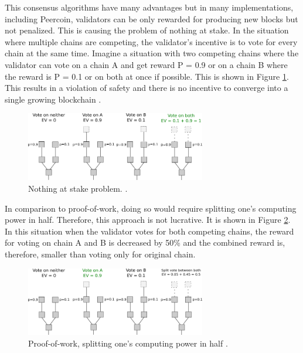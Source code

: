 This consensus algorithms have many advantages but in many implementations, including Peercoin, validators can be only rewarded for producing new blocks but not penalized. This is causing the problem of nothing at stake. In the situation where multiple chains are competing, the validator's incentive is to vote for every chain at the same time. Imagine a situation with two competing chains where the validator can vote on a chain A and get reward P = 0.9 or on a chain B where the reward is P = 0.1 or on both at once if possible. This is shown in Figure \ref{fig:nothing-at-stake}. This results in a violation of safety and there is no incentive to converge into a single growing blockchain \cite{noauthor_proof_nodate}.

\begin{figure}[ht]
	\centering
	\includegraphics[width=0.7\textwidth]{images/nothing-at-stake.png}
	\caption{\label{fig:nothing-at-stake} Nothing at stake problem. \cite{noauthor_proof_nodate}.}
\end{figure}

In comparison to proof-of-work, doing so would require splitting one's computing power in half. Therefore, this approach is not lucrative. It is shown in Figure \ref{fig:nothing-at-stake-pow}. In this situation when the validator votes for both competing chains, the reward for voting on chain A and B is decreased by 50\% and the combined reward is, therefore, smaller than voting only for original chain.

\begin{figure}[ht]
	\centering
	\includegraphics[width=0.7\textwidth]{images/nothing-at-stake-pow.png}
	\caption{\label{fig:nothing-at-stake-pow}Proof-of-work, splitting one's computing power in half  \cite{noauthor_proof_nodate}.}
\end{figure}


